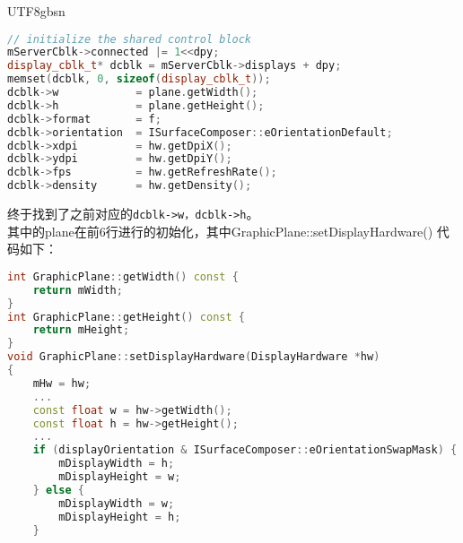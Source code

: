 \documentclass[a4paper,11pt]{article}
\begin{document}
\begin{CJK*}{UTF8}{gbsn}
\begin{enumerate}
\begin{lstlisting}[language=C++]
// initialize the shared control block
mServerCblk->connected |= 1<<dpy;
display_cblk_t* dcblk = mServerCblk->displays + dpy;
memset(dcblk, 0, sizeof(display_cblk_t));
dcblk->w            = plane.getWidth();
dcblk->h            = plane.getHeight();
dcblk->format       = f;
dcblk->orientation  = ISurfaceComposer::eOrientationDefault;
dcblk->xdpi         = hw.getDpiX();
dcblk->ydpi         = hw.getDpiY();
dcblk->fps          = hw.getRefreshRate();                                                                                                                                                
dcblk->density      = hw.getDensity();
\end{lstlisting}
        终于找到了之前对应的\texttt{dcblk->w，dcblk->h}。\\
        其中的plane在前6行进行的初始化，其中GraphicPlane::setDisplayHardware()
        代码如下：
\begin{lstlisting}[language=C++]
int GraphicPlane::getWidth() const {
    return mWidth;
}
int GraphicPlane::getHeight() const {
    return mHeight;
}
void GraphicPlane::setDisplayHardware(DisplayHardware *hw)
{
    mHw = hw;
    ...
    const float w = hw->getWidth();
    const float h = hw->getHeight();
    ...
    if (displayOrientation & ISurfaceComposer::eOrientationSwapMask) {
        mDisplayWidth = h;
        mDisplayHeight = w;
    } else {
        mDisplayWidth = w;
        mDisplayHeight = h;
    }


\end{lstlisting}
\end{enumerate}
\end{CJK*}
\end{document}

